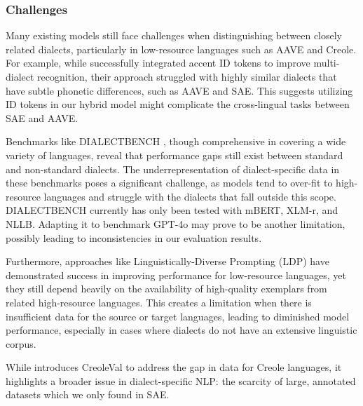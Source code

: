 \subsubsection{Challenges}

Many existing models still face challenges when distinguishing between closely related dialects, particularly in low-resource languages such as AAVE and Creole. For example, while \cite{Jauhiainen:19} successfully integrated accent ID tokens to improve multi-dialect recognition, their approach struggled with highly similar dialects that have subtle phonetic differences, such as AAVE and SAE. This suggests utilizing ID tokens in our hybrid model might complicate the cross-lingual tasks between SAE and AAVE. 

Benchmarks like DIALECTBENCH \cite{Faisal:24}, though comprehensive in covering a wide variety of languages, reveal that performance gaps still exist between standard and non-standard dialects. The underrepresentation of dialect-specific data in these benchmarks poses a significant challenge, as models tend to over-fit to high-resource languages and struggle with the dialects that fall outside this scope. DIALECTBENCH currently has only been tested with mBERT, XLM-r, and NLLB. Adapting it to benchmark GPT-4o may prove to be another limitation, possibly leading to inconsistencies in our evaluation results.

Furthermore, approaches like Linguistically-Diverse Prompting (LDP) \cite{Nguyen:24} have demonstrated success in improving performance for low-resource languages, yet they still depend heavily on the availability of high-quality exemplars from related high-resource languages. This creates a limitation when there is insufficient data for the source or target languages, leading to diminished model performance, especially in cases where dialects do not have an extensive linguistic corpus.

While \cite{Lent:24} introduces CreoleVal to address the gap in data for Creole languages, it highlights a broader issue in dialect-specific NLP: the scarcity of large, annotated datasets which we only found in SAE.